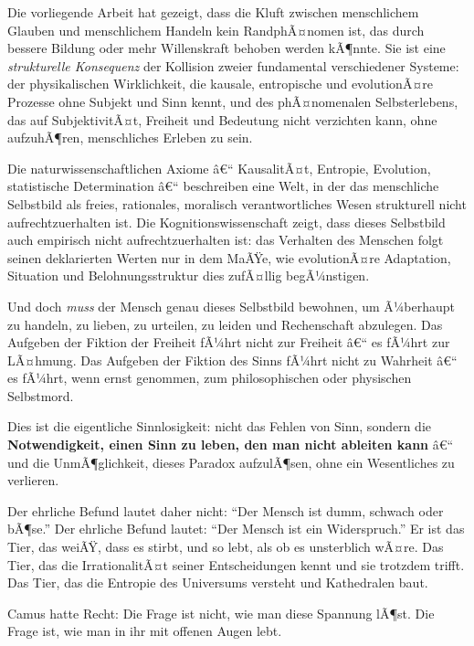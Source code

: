 ﻿\documentclass[12pt, a4paper]{article}
\begin{document}
Die vorliegende Arbeit hat gezeigt, dass die Kluft zwischen menschlichem Glauben
und menschlichem Handeln kein RandphÃ¤nomen ist, das durch bessere Bildung oder
mehr Willenskraft behoben werden kÃ¶nnte. Sie ist eine \emph{strukturelle Konsequenz}
der Kollision zweier fundamental verschiedener Systeme: der physikalischen
Wirklichkeit, die kausale, entropische und evolutionÃ¤re Prozesse ohne Subjekt
und Sinn kennt, und des phÃ¤nomenalen Selbsterlebens, das auf SubjektivitÃ¤t,
Freiheit und Bedeutung nicht verzichten kann, ohne aufzuhÃ¶ren, menschliches
Erleben zu sein.

Die naturwissenschaftlichen Axiome â€“ KausalitÃ¤t, Entropie, Evolution, statistische
Determination â€“ beschreiben eine Welt, in der das menschliche Selbstbild als
freies, rationales, moralisch verantwortliches Wesen strukturell nicht
aufrechtzuerhalten ist. Die Kognitionswissenschaft zeigt, dass dieses Selbstbild
auch empirisch nicht aufrechtzuerhalten ist: das Verhalten des Menschen folgt
seinen deklarierten Werten nur in dem MaÃŸe, wie evolutionÃ¤re Adaptation,
Situation und Belohnungsstruktur dies zufÃ¤llig begÃ¼nstigen.

Und doch \emph{muss} der Mensch genau dieses Selbstbild bewohnen, um Ã¼berhaupt
zu handeln, zu lieben, zu urteilen, zu leiden und Rechenschaft abzulegen. Das
Aufgeben der Fiktion der Freiheit fÃ¼hrt nicht zur Freiheit â€“ es fÃ¼hrt zur LÃ¤hmung.
Das Aufgeben der Fiktion des Sinns fÃ¼hrt nicht zu Wahrheit â€“ es fÃ¼hrt, wenn
ernst genommen, zum philosophischen oder physischen Selbstmord.

Dies ist die eigentliche Sinnlosigkeit: nicht das Fehlen von Sinn, sondern die
\textbf{Notwendigkeit, einen Sinn zu leben, den man nicht ableiten kann} â€“ und
die UnmÃ¶glichkeit, dieses Paradox aufzulÃ¶sen, ohne ein Wesentliches zu verlieren.

Der ehrliche Befund lautet daher nicht: \enquote{Der Mensch ist dumm, schwach
oder bÃ¶se.} Der ehrliche Befund lautet: \enquote{Der Mensch ist ein
Widerspruch.} Er ist das Tier, das weiÃŸ, dass es stirbt, und so lebt, als ob
es unsterblich wÃ¤re. Das Tier, das die IrrationalitÃ¤t seiner Entscheidungen kennt
und sie trotzdem trifft. Das Tier, das die Entropie des Universums versteht
und Kathedralen baut.

Camus hatte Recht: Die Frage ist nicht, wie man diese Spannung lÃ¶st. Die
Frage ist, wie man in ihr mit offenen Augen lebt.

\end{document}
